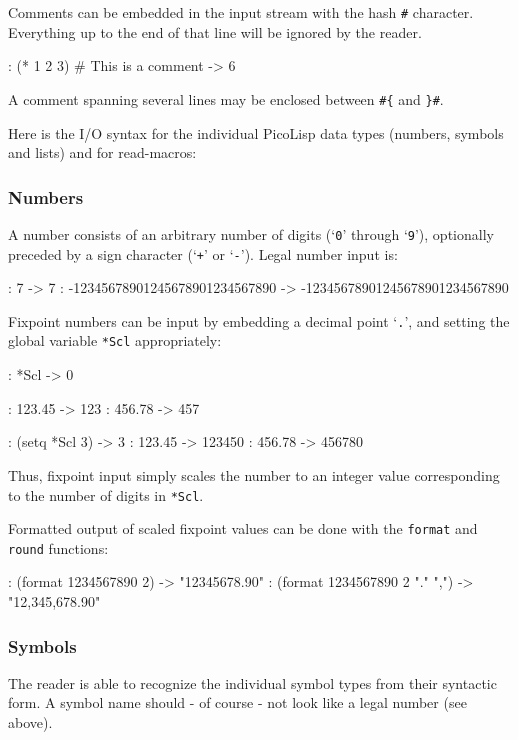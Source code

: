 Comments can be embedded in the input stream with the hash \texttt{\#}
character. Everything up to the end of that line will be ignored by the
reader.


\begin{wideverbatim}
: (* 1 2 3)  # This is a comment
-> 6
\end{wideverbatim}

A comment spanning several lines may be enclosed between \texttt{\#\{} and \texttt{\}\#}.

Here is the I/O syntax for the individual PicoLisp data types (numbers,
symbols and lists) and for read-macros:

 

\subsubsection{Numbers}
\label{sec:refm-numbers}%
A number consists of an arbitrary number of digits (`\texttt{0}' through
`\texttt{9}'), optionally preceded by a sign character (`\texttt{+}' or `\texttt{-}'). Legal
number input is:


\begin{wideverbatim}
: 7
-> 7
: -12345678901245678901234567890
-> -12345678901245678901234567890
\end{wideverbatim}

Fixpoint numbers can be input by embedding a decimal point `\texttt{.}', and
setting the global variable \texttt{*Scl} appropriately:


\begin{wideverbatim}
: *Scl
-> 0

: 123.45
-> 123
: 456.78
-> 457

: (setq *Scl 3)
-> 3
: 123.45
-> 123450
: 456.78
-> 456780
\end{wideverbatim}

Thus, fixpoint input simply scales the number to an integer value
corresponding to the number of digits in \texttt{*Scl}.

Formatted output of scaled fixpoint values can be done with the \texttt{format}
and \texttt{round} functions:


\begin{wideverbatim}
: (format 1234567890 2)
-> "12345678.90"
: (format 1234567890 2 "." ",")
-> "12,345,678.90"
\end{wideverbatim}


\subsubsection{Symbols}
\label{sec:refm-symbols}%
The reader is able to recognize the individual symbol types from their
syntactic form. A symbol name should - of course - not look like a legal
number (see above).

